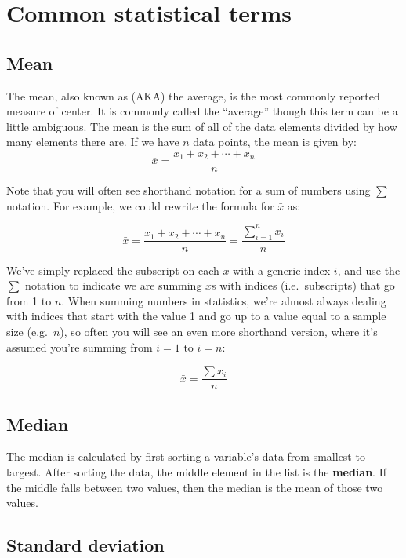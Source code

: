 \documentclass[
  letterpaper,
  DIV=11,
  numbers=noendperiod]{scrreprt}
\theoremstyle{definition}
\theoremstyle{remark}
\begin{document}
\hypertarget{common-statistical-terms}{%
\section{Common statistical terms}\label{common-statistical-terms}}

\hypertarget{mean}{%
\subsection{Mean}\label{mean}}

The mean, also known as (AKA) the average, is the most commonly reported
measure of center. It is commonly called the ``average'' though this
term can be a little ambiguous. The mean is the sum of all of the data
elements divided by how many elements there are. If we have \(n\) data
points, the mean is given by:
\[\overline{x} = \frac{x_1 + x_2 + \cdots + x_n}{n}\]

Note that you will often see shorthand notation for a sum of numbers
using \(\sum\) notation. For example, we could rewrite the formula for
\(\bar{x}\) as:

\[\bar{x} = \frac{x_1 + x_2 + \cdots + x_n}{n}=\frac{\sum_{i = 1}^n x_i}{n}\]

We've simply replaced the subscript on each \(x\) with a generic index
\(i\), and use the \(\sum\) notation to indicate we are summing \(x\)s
with indices (i.e.~subscripts) that go from 1 to \(n\). When summing
numbers in statistics, we're almost always dealing with indices that
start with the value 1 and go up to a value equal to a sample size
(e.g.~\(n\)), so often you will see an even more shorthand version,
where it's assumed you're summing from \(i = 1\) to \(i = n\):

\[\bar{x} = \frac{\sum x_i}{n}\]

\hypertarget{median}{%
\subsection{Median}\label{median}}

The median is calculated by first sorting a variable's data from
smallest to largest. After sorting the data, the middle element in the
list is the \textbf{median}. If the middle falls between two values,
then the median is the mean of those two values.

\hypertarget{standard-deviation}{%
\subsection{Standard deviation}\label{standard-deviation}}
\end{document}
